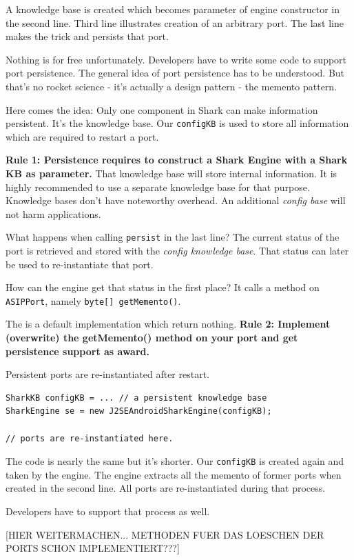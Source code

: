 A knowledge base is created which becomes parameter of engine constructor in
the second line. Third line illustrates creation of an arbitrary port. The last
line makes the trick and persists that port.

Nothing is for free unfortunately. Developers have to write some code to support
port persistence. The general idea of port persistence has to be understood.
But that's no rocket science - it's actually a design pattern - the memento pattern.

Here comes the idea: Only one component in Shark can make information persistent.
It's the knowledge base. Our {\tt configKB} is used to store all information which
are required to restart a port.

{\bf Rule 1: Persistence requires to construct a Shark Engine with a 
Shark KB as parameter.} That knowledge base will store internal information.
It is highly recommended to use a separate knowledge base for that purpose.
Knowledge bases don't have noteworthy overhead. An additional {\it config base}
will not harm applications.

What happens when calling {\tt persist} in the last line?
The current status of the port is retrieved and stored with
the {\it config knowledge base}. That status can later be used
to re-instantiate that port.

How can the engine get that status in the first place?
It calls a method on {\tt ASIPPort}, namely {\tt byte[] getMemento()}.

The is a default implementation which return nothing.
{\bf Rule 2: Implement (overwrite) the getMemento() method on your 
port and get persistence support as award.}

Persistent ports are re-instantiated after restart. 

\begin{verbatim}
SharkKB configKB = ... // a persistent knowledge base
SharkEngine se = new J2SEAndroidSharkEngine(configKB);

// ports are re-instantiated here.
\end{verbatim}

The code is nearly the same but it's shorter. Our {\tt configKB}
is created again and taken by the engine. The engine extracts
all the memento of former ports when created in the second line.
All ports are re-instantiated during that process.

Developers have to support that process as well. 

[HIER WEITERMACHEN... METHODEN FUER DAS LOESCHEN DER PORTS SCHON
IMPLEMENTIERT???] 


